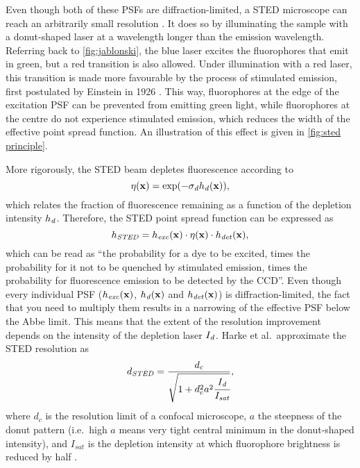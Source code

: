 Even though both of these PSFs are diffraction-limited, a STED microscope can reach an arbitrarily small resolution \cite{Wildanger2012}. It does so by illuminating the sample with a donut-shaped laser at a wavelength longer than the emission wavelength. Referring back to \autoref{fig:jablonski}, the blue laser excites the fluorophores that emit in green, but a red transition is also allowed. Under illumination with a red laser, this transition is made more favourable by the process of stimulated emission, first postulated by Einstein in 1926 \cite{Einstein1926}. This way, fluorophores at the edge of the excitation PSF can be prevented from emitting green light, while fluorophores at the centre do not experience stimulated emission, which reduces the width of the effective point spread function. An illustration of this effect is given in \autoref{fig:sted principle}.


More rigorously, the STED beam depletes fluorescence according to
\begin{equation}
	\eta(\vb{x}) = \exp(-\sigma_{\mathit{d}} h_{\mathit{d}}(\vb{x})),
\end{equation}
which relates the fraction of fluorescence remaining as a function of the depletion intensity $ h_{\mathit{d}} $. Therefore, the STED point spread function can be expressed as
\begin{equation}
	h_\mathit{STED} = h_\mathit{exc}(\vb{x}) \cdot \eta(\vb{x}) \cdot h_\mathit{det}(\vb{x}),
\end{equation}
which can be read as ``the probability for a dye to be excited, times the probability for it not to be quenched by stimulated emission, times the probability for fluorescence emission to be detected by the CCD''. Even though every individual PSF ($ h_\mathit{exc}(\vb{x}) $, $ h_{\mathit{d}}(\vb{x}) $ and $ h_\mathit{det}(\vb{x}) $) is diffraction-limited, the fact that you need to multiply them results in a narrowing of the effective PSF below the Abbe limit. This means that the extent of the resolution improvement depends on the intensity of the depletion laser $ I_{\mathit{d}}$. Harke et al.~approximate the STED resolution as
\begin{equation}
	d_\mathit{STED} = \frac{d_c}{\sqrt{1+d_c^2a^2\cfrac{I_{\mathit{d}}}{I_\mathit{sat}}}},
\end{equation}
where $ d_c $ is the resolution limit of a confocal microscope, $ a $ the steepness of the donut pattern (i.e.~high $ a $ means very tight central minimum in the donut-shaped intensity), and $ I_\mathit{sat} $ is the depletion intensity at which fluorophore brightness is reduced by half \cite{Harke2008}.

